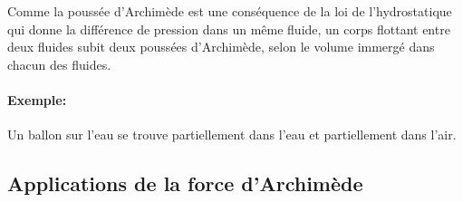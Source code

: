 \documentclass[
    11pt,
    a4paper,
    oneside,
    headinlcude, footinclude,
    twoside,
]{report}
\begin{document}
Comme la pouss\'ee d'Archim\`ede est une cons\'equence de la loi de l'hydrostatique 
qui donne la diff\'erence de pression dans un m\^eme fluide, un corps flottant
entre deux fluides subit deux pouss\'ees d'Archim\`ede, selon le volume
immerg\'e dans chacun des fluides.


\paragraph{Exemple:}

Un ballon sur l'eau se trouve partiellement dans l'eau et partiellement dans
l'air.

\subsection{Applications de la force d'Archim\`ede}
\label{sub:applications_de_la_force_d_archi}
\end{document}
